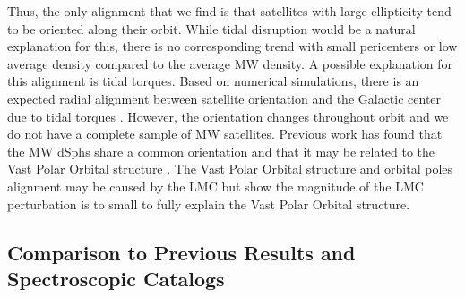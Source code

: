 \documentclass[twocolumn]{aastex63}
\begin{document}
Thus, the only alignment that we find is that satellites with large ellipticity tend to be oriented along their orbit.  While tidal disruption would be a natural explanation for this, there is no corresponding trend with small pericenters or low average density compared to the average MW density. 
A possible explanation for this alignment is  tidal torques. 
Based on numerical simulations, there is an expected radial alignment between satellite orientation and the Galactic center due to tidal torques \citep{Pereira2008ApJ...672..825P}. However, the orientation changes throughout orbit and we do not have a complete sample of MW satellites.
Previous work has found that the MW dSphs share a common  orientation and that it may be related to the Vast Polar Orbital structure  \citep{Sanders2017MNRAS.472.2670S}. 
The Vast Polar Orbital structure  and orbital poles alignment may be caused by the  LMC \citep{GaravitoCamargo2021arXiv210807321G} but  \citet{Pawlowski2021arXiv211105358P} show the magnitude of the LMC perturbation is to small to fully explain the Vast Polar Orbital structure.






\subsection{Comparison to Previous Results and Spectroscopic Catalogs}


\end{document}
